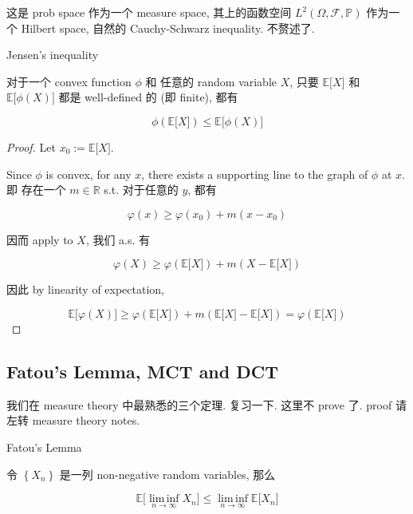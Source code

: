 \documentclass{qlnotes-export}
\begin{document}
这是 prob space 作为一个 measure space, 其上的函数空间 \(L^{2}(\Omega,\mathcal{F},{\mathbb{P}})\) 作为一个 Hilbert space, 自然的 Cauchy-Schwarz inequality. 不赘述了.

\begin{theorem}{Jensen's inequality}\label{thm-04-lln-jensens-inequality}

对于一个 convex function \(\phi\) 和 任意的 random variable \(X\), 只要 \({\mathbb{E}}\lbrack X\rbrack\) 和 \({\mathbb{E}}\lbrack\phi(X)\rbrack\) 都是 well-defined 的 (即 finite), 都有

\[\phi({\mathbb{E}}\lbrack X\rbrack) \leq {\mathbb{E}}\lbrack\phi(X)\rbrack\]

\end{theorem}

\begin{proof}

Let \(x_{0} := {\mathbb{E}}\lbrack X\rbrack\).

Since \(\phi\) is convex, for any \(x\), there exists a supporting line to the graph of \(\phi\) at \(x\). 即 存在一个 \(m \in {\mathbb{R}}\) s.t. 对于任意的 \(y\), 都有

\[\varphi(x) \geq \varphi\left( x_{0} \right) + m\left( {x - x_{0}} \right)\]

因而 apply to \(X\), 我们 a.s. 有

\[\varphi(X) \geq \varphi({\mathbb{E}}\lbrack X\rbrack) + m(X - {\mathbb{E}}\lbrack X\rbrack)\]

因此 by linearity of expectation,

\[{\mathbb{E}}\lbrack\varphi(X)\rbrack \geq \varphi({\mathbb{E}}\lbrack X\rbrack) + m({\mathbb{E}}\lbrack X\rbrack - {\mathbb{E}}\lbrack X\rbrack) = \varphi({\mathbb{E}}\lbrack X\rbrack)\]

\end{proof}

\subsection{Fatou's Lemma, MCT and DCT}\label{fatous-lemma-mct-and-dct}

我们在 measure theory 中最熟悉的三个定理. 复习一下. 这里不 prove 了. proof 请左转 measure theory notes.

\begin{theorem}{Fatou's Lemma}\label{thm-04-lln-fatous-lemma}

令 \(\left\{ X_{n} \right\}\) 是一列 non-negative random variables, 那么

\[{\mathbb{E}}\lbrack\operatorname{lim\, inf}\limits_{n\rightarrow\infty}X_{n}\rbrack \leq \operatorname{lim\, inf}\limits_{n\rightarrow\infty}{\mathbb{E}}\lbrack X_{n}\rbrack\]

\end{theorem}
\end{document}
